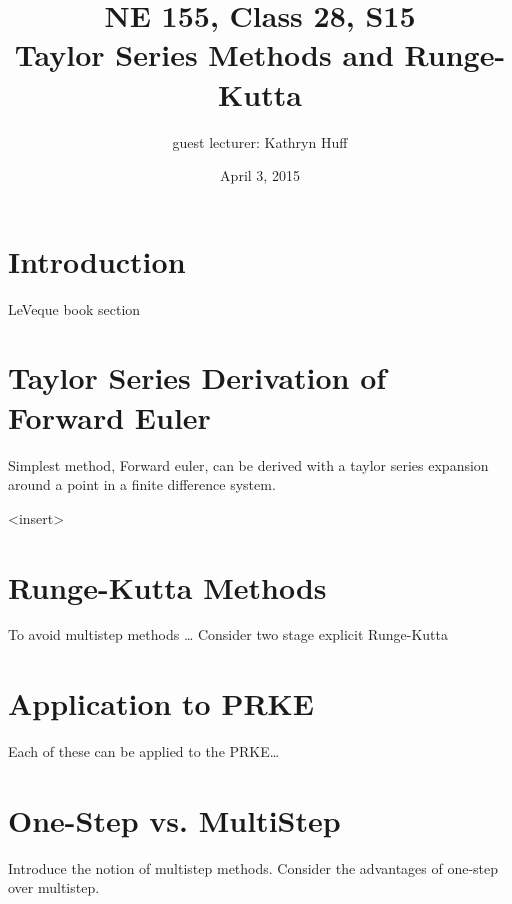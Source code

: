 \documentclass[12pt]{article}
\title{NE 155, Class 28, S15 \\
Taylor Series Methods and Runge-Kutta}
\date{April 3, 2015}
\begin{document}
\author{guest lecturer: Kathryn Huff}
\maketitle

\hrulefill

\section{Introduction}

LeVeque book section

\section{Taylor Series Derivation of Forward Euler}

Simplest method, Forward euler, can be derived with a taylor series expansion 
around a point in a finite difference system. 

<insert>

\section{Runge-Kutta Methods}

To avoid multistep methods \dots
Consider two stage explicit Runge-Kutta


\section{Application to PRKE}
Each of these can be applied to the PRKE\dots


\section{One-Step vs. MultiStep}
Introduce the notion of multistep methods.
Consider the advantages of one-step over multistep.
\end{document}
